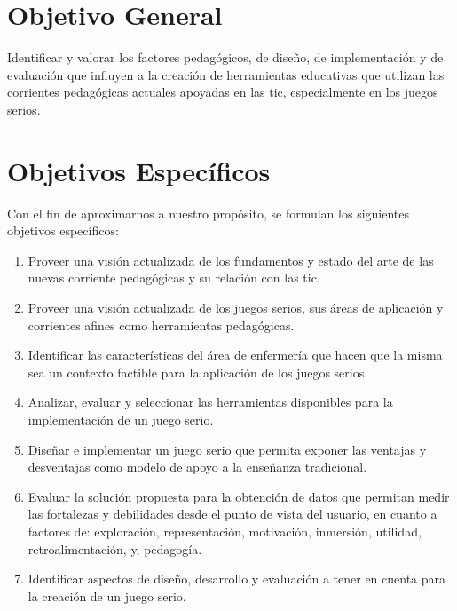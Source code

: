 \section{Objetivo General}
\label{sec:objetivos_generales}

Identificar y valorar los factores pedagógicos, de diseño, de implementación y
de evaluación que influyen a la creación de herramientas educativas que utilizan
las corrientes pedagógicas actuales apoyadas en las \gls{tic}, especialmente en
los juegos serios. 

\section{Objetivos Específicos}

Con el fin de aproximarnos a nuestro propósito, se formulan los siguientes
objetivos específicos:

\begin{enumerate}
   \item Proveer una visión actualizada de los fundamentos y estado del arte de
        las nuevas corriente pedagógicas y su relación con las \Gls{tic}.

    \item Proveer una visión actualizada de los juegos serios, sus áreas de
        aplicación y corrientes afines como herramientas pedagógicas.
    
    \item Identificar las características del área de enfermería que hacen que
        la misma sea un contexto factible para la aplicación de los juegos
        serios.
    
    \item Analizar, evaluar y seleccionar las herramientas disponibles para la
        implementación de un juego serio.
        
    \item Diseñar e implementar un juego serio que permita exponer las ventajas
        y desventajas como modelo de apoyo a la enseñanza tradicional. 
        
    \item Evaluar la solución propuesta para la obtención de datos que permitan
        medir las fortalezas y debilidades desde el punto de vista del usuario,
        en cuanto a factores de: exploración, representación, motivación,
        inmersión, utilidad, retroalimentación, y, pedagogía.
         
     \item Identificar aspectos de diseño, desarrollo y evaluación a tener en
         cuenta para la creación de un juego serio.
\end{enumerate}
